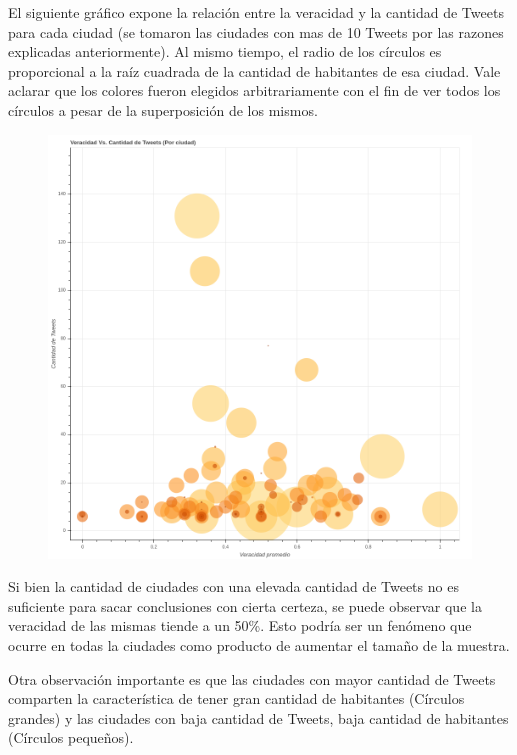 \documentclass[titlepage,a4paper]{article}
\begin{document}
    El siguiente gráfico expone la relación entre la veracidad y la cantidad de Tweets para cada ciudad (se tomaron las ciudades con mas de 10 Tweets por las razones explicadas anteriormente). Al mismo tiempo, el radio de los círculos es proporcional a la raíz cuadrada de la cantidad de habitantes de esa ciudad. Vale aclarar que los colores fueron elegidos arbitrariamente con el fin de ver todos los círculos a pesar de la superposición de los mismos.
    
    \begin{figure}[H]
    \centering
    \includegraphics[width=1\textwidth]{graficos/Analisis de Locacion/veracidad_vs_antidad_de_tweets_por_ciudad.png}
    \caption{}
    \end{figure}
    
    Si bien la cantidad de ciudades con una elevada cantidad de Tweets no es suficiente para sacar conclusiones con cierta certeza, se puede observar que la veracidad de las mismas tiende a un 50\%. Esto podría ser un fenómeno que ocurre en todas la ciudades como producto de aumentar el tamaño de la muestra.
    
    Otra observación importante es que las ciudades con mayor cantidad de Tweets comparten la característica de tener gran cantidad de habitantes (Círculos grandes) y las ciudades con baja cantidad de Tweets, baja cantidad de habitantes (Círculos pequeños).
    
\end{document}
